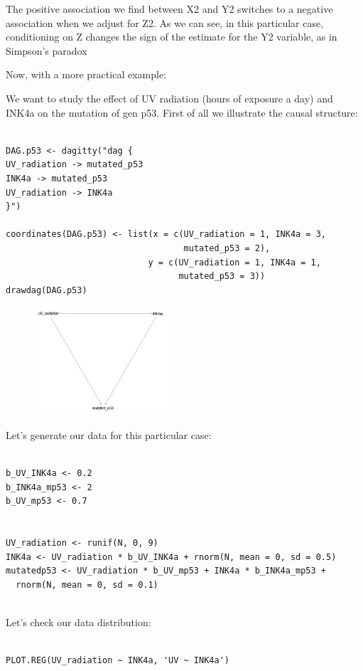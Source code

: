\documentclass{article}
\begin{document}
The positive association we find between X2 and Y2 switches to a negative association when we adjust for Z2. As we can see, in this particular case, conditioning on Z changes the sign of the estimate for the Y2 variable, as in Simpson's paradox


Now, with a more practical example: 

We want to study the effect of UV radiation (hours of exposure a day) and INK4a on the mutation of gen p53. First of all we illustrate the causal structure:

\begin{lstlisting}

DAG.p53 <- dagitty("dag {
UV_radiation -> mutated_p53
INK4a -> mutated_p53
UV_radiation -> INK4a
}")

coordinates(DAG.p53) <- list(x = c(UV_radiation = 1, INK4a = 3, 
                                   mutated_p53 = 2),
                            y = c(UV_radiation = 1, INK4a = 1, 
                                  mutated_p53 = 3))
drawdag(DAG.p53)

\end{lstlisting}


\begin{figure}[h]
\includegraphics[width=5cm]{DAG_UV_INK_P53.png}
\centering
\end{figure}


Let's generate our data for this particular case:


\begin{lstlisting}

b_UV_INK4a <- 0.2
b_INK4a_mp53 <- 2
b_UV_mp53 <- 0.7


UV_radiation <- runif(N, 0, 9)
INK4a <- UV_radiation * b_UV_INK4a + rnorm(N, mean = 0, sd = 0.5)
mutatedp53 <- UV_radiation * b_UV_mp53 + INK4a * b_INK4a_mp53 + 
  rnorm(N, mean = 0, sd = 0.1)
  
\end{lstlisting}

Let's check our data distribution: 

\begin{lstlisting}

PLOT.REG(UV_radiation ~ INK4a, 'UV ~ INK4a')

\end{lstlisting}
\end{document}
